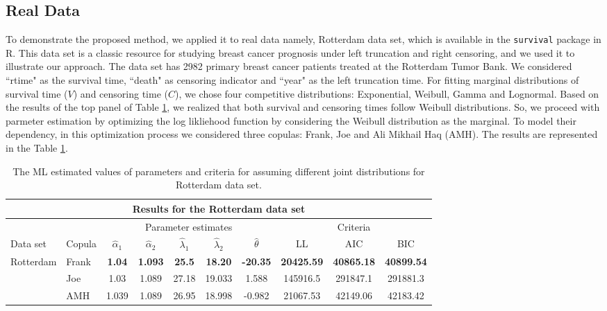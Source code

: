 \documentclass[twoside]{article}
\begin{document}
\subsection{Real Data}
To demonstrate the proposed method, we applied it to  real data namely, Rotterdam data set, which is   available in the \texttt{survival} package in R.
This data set is a classic resource for studying breast cancer prognosis under left truncation and right censoring, and we used it to illustrate our approach. The data set has 2982 primary breast cancer patients treated at the Rotterdam Tumor Bank. We considered ``rtime" as the survival time, ``death" as censoring indicator and  ``year" as the left truncation time.
For fitting marginal distributions   of survival time ($V$) and censoring time ($C$), we chose four competitive distributions:  Exponential, Weibull, Gamma and Lognormal.   Based on the results of the top panel of Table \ref{tab:cop}, we realized that both survival and censoring times follow Weibull distributions. So, we proceed with  parmeter estimation by optimizing the log likliehood  function by considering the Weibull  distribution as the marginal.  To model their dependency, in this optimization process we considered three copulas:  Frank, Joe   and Ali Mikhail Haq (AMH). The results are represented in the  Table \ref{tab:cop}.
\begin{table}[h]
\begin{center}
\renewcommand{\arraystretch}{0.7}
\setlength{\tabcolsep}{3pt}
\small
\begin{tabular}{|l|l|c|c|c|c|c|c|c|c|}
\hline
\multicolumn{10}{|c|}{Results for the Rotterdam data set} \\
\hline
\multicolumn{2}{|c|}{} & \multicolumn{5}{c|}{Parameter estimates} & \multicolumn{3}{c|}{Criteria} \\
\hline
Data set & Copula & $\hat{\alpha}_1$ & $\hat{\alpha}_2$ & $\hat{\lambda}_1$ & $\hat{\lambda}_2$ & $\hat{\theta}$ & LL & AIC & BIC \\
\hline
Rotterdam & Frank   & \textbf{1.04} & \textbf{1.093} & \textbf{25.5} & \textbf{18.20} & \textbf{-20.35} & \textbf{20425.59} & \textbf{40865.18} & \textbf{40899.54} \\
~ & Joe     & 1.03  & 1.089  & 27.18 & 19.033 & 1.588 & 145916.5 & 291847.1 & 291881.3 \\
~ & AMH     & 1.039 & 1.089  & 26.95 & 18.998 & -0.982 & 21067.53 & 42149.06 & 42183.42 \\
\hline
\end{tabular}
\end{center}
\caption{The ML estimated values of parameters and criteria for assuming different joint distributions for Rotterdam data set.}
\label{tab:cop}
\end{table}
\end{document}

